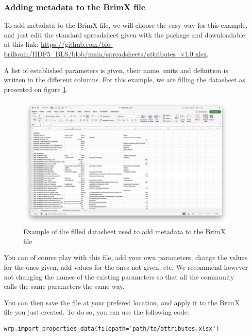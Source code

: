 \documentclass{article}
\begin{document}
\subsubsection{Adding metadata to the BrimX file}

To add metadata to the BrimX file, we will choose the easy way for this example, and just edit the standard spreadsheet given with the package and downloadable at this link: \url{https://github.com/bio-brillouin/HDF5_BLS/blob/main/spreadsheets/attributes_v1.0.xlsx}.

A list of established parameters is given, their name, units and definition is written in the different columns. For this example, we are filling the datasheet as presented on figure \ref{fig:excel_attributes}.
\begin{figure}[H]
    \centering
    \includegraphics[width=\textwidth]{img/Excel_attributes.png}
    \caption{Example of the filled datasheet used to add metadata to the BrimX file}
    \label{fig:excel_attributes}
\end{figure}

You can of course play with this file, add your own parameters, change the values for the ones given, add values for the ones not given, etc. We recommend however not changing the names of the existing parameters so that all the community calls the same parameters the same way.

You can then save the file at your prefered location, and apply it to the BrimX file you just created. To do so, you can use the following code:

\begin{lstlisting}
wrp.import_properties_data(filepath='path/to/attributes.xlsx')
\end{lstlisting}
\end{document}
